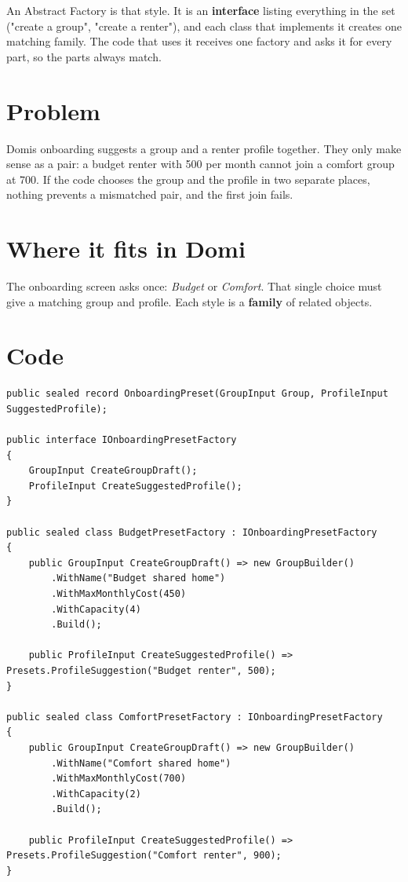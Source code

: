 \documentclass{utmreport}
\begin{document}
An Abstract Factory is that style. It is an \textbf{interface} listing everything in the set ("create a group", "create a renter"), and each class that implements it creates one matching family. The code that uses it receives one factory and asks it for every part, so the parts always match.

\section{Problem}

Domi\textquotesingle s onboarding suggests a group and a renter profile together. They only make sense as a pair: a budget renter with 500 per month cannot join a comfort group at 700. If the code chooses the group and the profile in two separate places, nothing prevents a mismatched pair, and the first join fails.

\section{Where it fits in Domi}

The onboarding screen asks once: \emph{Budget} or \emph{Comfort}. That single choice must give a matching group and profile. Each style is a \textbf{family} of related objects.

\section{Code}

\begin{lstlisting}
public sealed record OnboardingPreset(GroupInput Group, ProfileInput SuggestedProfile);

public interface IOnboardingPresetFactory
{
    GroupInput CreateGroupDraft();
    ProfileInput CreateSuggestedProfile();
}

public sealed class BudgetPresetFactory : IOnboardingPresetFactory
{
    public GroupInput CreateGroupDraft() => new GroupBuilder()
        .WithName("Budget shared home")
        .WithMaxMonthlyCost(450)
        .WithCapacity(4)
        .Build();

    public ProfileInput CreateSuggestedProfile() => Presets.ProfileSuggestion("Budget renter", 500);
}

public sealed class ComfortPresetFactory : IOnboardingPresetFactory
{
    public GroupInput CreateGroupDraft() => new GroupBuilder()
        .WithName("Comfort shared home")
        .WithMaxMonthlyCost(700)
        .WithCapacity(2)
        .Build();

    public ProfileInput CreateSuggestedProfile() => Presets.ProfileSuggestion("Comfort renter", 900);
}
\end{lstlisting}
\end{document}
